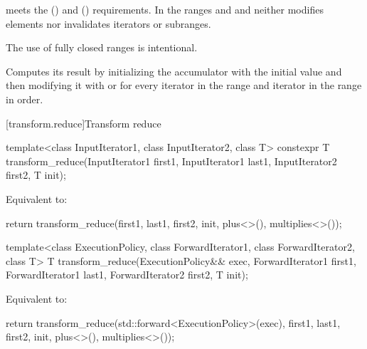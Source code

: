 \begin{itemdescr}
\pnum
\expects
{} meets
the  ()
and  () requirements.
In the ranges  and
 and 
neither modifies elements nor invalidates iterators or subranges.
\begin{footnote}
The use of fully closed ranges is intentional.
\end{footnote}

\pnum
\effects
Computes its result by
initializing the accumulator  with the initial value 
and then modifying it with
 or
for every iterator  in the range 
and iterator  in the range 
in order.
\end{itemdescr}

[transform.reduce]{Transform reduce}
%
\begin{itemdecl}
template<class InputIterator1, class InputIterator2, class T>
  constexpr T transform_reduce(InputIterator1 first1, InputIterator1 last1,
                               InputIterator2 first2,
                               T init);
\end{itemdecl}

\begin{itemdescr}
\pnum
\effects
Equivalent to:
\begin{codeblock}
return transform_reduce(first1, last1, first2, init, plus<>(), multiplies<>());
\end{codeblock}
\end{itemdescr}

%
\begin{itemdecl}
template<class ExecutionPolicy,
         class ForwardIterator1, class ForwardIterator2, class T>
  T transform_reduce(ExecutionPolicy&& exec,
                     ForwardIterator1 first1, ForwardIterator1 last1,
                     ForwardIterator2 first2,
                     T init);
\end{itemdecl}

\begin{itemdescr}
\pnum
\effects
Equivalent to:
\begin{codeblock}
return transform_reduce(std::forward<ExecutionPolicy>(exec),
                        first1, last1, first2, init, plus<>(), multiplies<>());
\end{codeblock}
\end{itemdescr}

